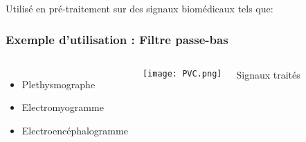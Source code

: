 \documentclass{beamer}
\begin{document}
\begin{frame}
Utilisé en pré-traitement sur des signaux biomédicaux tels que:
\frametitle{Exemple d'utilisation : Filtre passe-bas}
\begin{columns}
\column{60mm}
\begin{itemize}
\item Plethysmographe 
\vspace{1cm}
\item Electromyogramme 
\vspace{1cm}
\item Electroencéphalogramme
\end{itemize}
\vspace{0.6cm}
\column{60mm}
\texttt{[image: PVC.png]}
\\ \begin{center}
Signaux traités 
\end{center}


\end{columns}
\end{frame}
\end{document}
